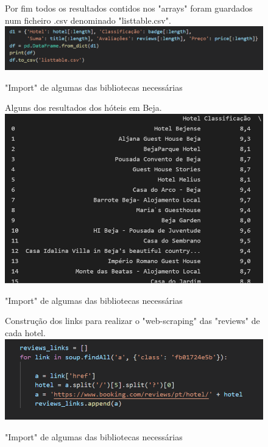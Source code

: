 \documentclass[a4paper,10pt]{article}
\begin{document}
\newpage

\begin{figure}[!htb]
Por fim todos os resultados contidos nos "arrays" foram guardados num ficheiro .csv denominado "listtable.csv".
    \centering
    \includegraphics[width=15cm]{6.PNG}
    \caption{"Import" de algumas das bibliotecas necessárias}
    \label{fig:my_label}
\end{figure}

\begin{figure}[!htb]
Alguns dos resultados dos hóteis em Beja.
    \centering
    \includegraphics[width=15cm]{7.PNG}
    \caption{"Import" de algumas das bibliotecas necessárias}
    \label{fig:my_label}
\end{figure}

\newpage

\begin{figure}[!htb]
Construção dos links para realizar o "web-scraping" das "reviews" de cada hotel.
    \centering
    \includegraphics[width=15cm]{8.PNG}
    \caption{"Import" de algumas das bibliotecas necessárias}
    \label{fig:my_label}
\end{figure}
\end{document}
